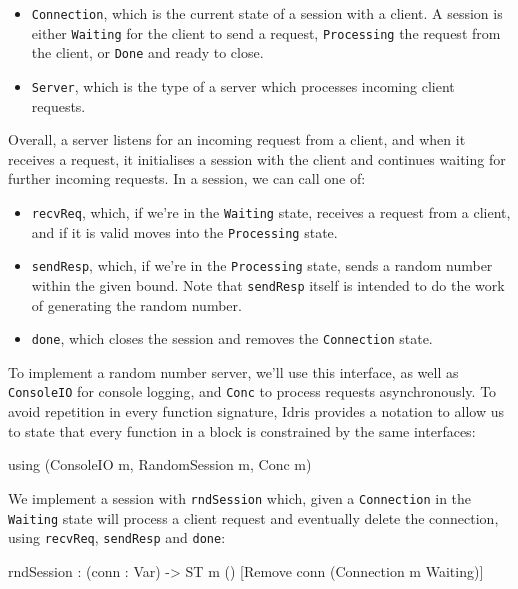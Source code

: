\begin{itemize}
\item \texttt{Connection}, which is the current state of a session with
a client. A session is either \texttt{Waiting} for the client to send
a request, \texttt{Processing} the request from the client, or \texttt{Done}
and ready to close.
\item \texttt{Server}, which is the type of a server which processes
incoming client requests.
\end{itemize}

Overall, a server listens for an incoming request from a client, 
and when it receives a request, it initialises a session with the client
and continues waiting for further incoming requests. In a session, we can
call one of:

\begin{itemize}
\item \texttt{recvReq}, which, if we're in the \texttt{Waiting} state,
receives a request from a client, and if it is valid moves into the
\texttt{Processing} state.
\item \texttt{sendResp}, which, if we're in the \texttt{Processing} state,
sends a random number within the given bound. Note that \texttt{sendResp}
itself is intended to do the work of generating the random number.
\item \texttt{done}, which closes the session and removes the \texttt{Connection}
state.
\end{itemize}

To implement a random number server, we'll use this interface, as well
as \texttt{ConsoleIO} for console logging, and \texttt{Conc} to process
requests asynchronously. To avoid repetition in every function signature,
Idris provides a notation to allow us to state that every function in a
block is constrained by the same interfaces:

\small
\begin{code}
using (ConsoleIO m, RandomSession m, Conc m)
\end{code}
\normalsize

We implement a session with \texttt{rndSession} which, given a
\texttt{Connection} in the \texttt{Waiting} state will process a client
request and eventually delete the connection, using \texttt{recvReq},
\texttt{sendResp} and \texttt{done}:

\small
\begin{code}
rndSession : (conn : Var) -> ST m () [Remove conn (Connection {m} Waiting)]
\end{code}
\normalsize

